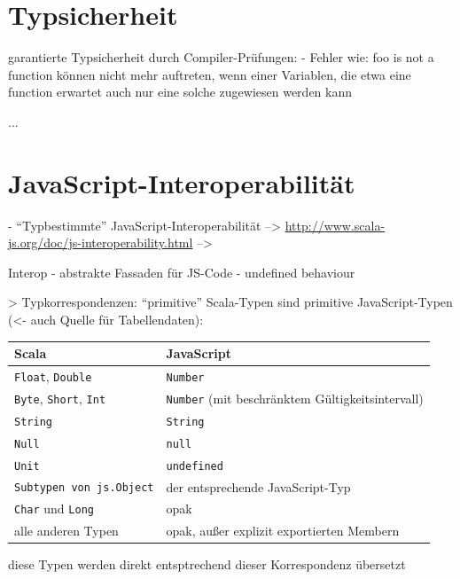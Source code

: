 \documentclass[a4paper, 12pt, hidelinks, listof=totoc, listoftables=totoc, bibliography=totoc]{scrreprt}
\begin{document}
\section{Typsicherheit}

garantierte Typsicherheit durch Compiler-Prüfungen:
- Fehler wie: foo is not a function können nicht mehr auftreten, wenn einer Variablen, die etwa eine function erwartet auch nur eine solche zugewiesen werden kann

...




\section{JavaScript-Interoperabilität}

- "`Typbestimmte"' JavaScript-Interoperabilität
-->  \url{http://www.scala-js.org/doc/js-interoperability.html}
-->  \cite{doeraene2013.TDI}

Interop
- abstrakte Fassaden für JS-Code
- undefined behaviour


> Typkorrespondenzen: "`primitive"' Scala-Typen sind primitive JavaScript-Typen\cite{doeraene2014.WHB} (<- auch Quelle für Tabellendaten):

\medskip

\begin{tabular}{|l|l|}
\hline \textbf{Scala} & \textbf{JavaScript} \\ 
\hline \texttt{Float}, \texttt{Double} & \texttt{Number} \\ 
\hline \texttt{Byte}, \texttt{Short}, \texttt{Int} & \texttt{Number} (mit beschränktem Gültigkeitsintervall) \\ 
\hline \texttt{String} & \texttt{String} \\ 
\hline \texttt{Null} & \texttt{null} \\ 
\hline \texttt{Unit} & \texttt{undefined} \\ 
\hline \texttt{Subtypen von js.Object} & der entsprechende JavaScript-Typ \\ 
\hline \texttt{Char} und \texttt{Long} & opak \\ 
\hline alle anderen Typen & opak, außer explizit exportierten Membern \\ 
\hline 
\end{tabular}

\medskip

diese Typen werden direkt entsptrechend dieser Korrespondenz übersetzt
\end{document}
